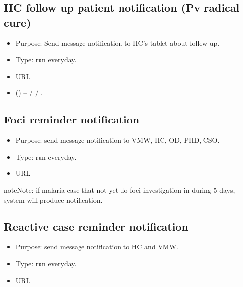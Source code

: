 \documentclass[letterpaper,10pt,english,openany,oneside]{sphinxmanual}
\begin{document}
\subsection{HC follow up patient notification (Pv radical cure)}
\label{\detokenize{cron-job/cron-job:hc-follow-up-patient-notification-pv-radical-cure}}\begin{itemize}
\item {} 
\sphinxAtStartPar
Purpose: Send message notification to HC’s tablet about follow up.

\item {} 
\sphinxAtStartPar
Type: run everyday.

\item {} 
\sphinxAtStartPar
URL 

\item {} 
\sphinxAtStartPar
{} () –  /  / .

\end{itemize}


\subsection{Foci reminder notification}
\label{\detokenize{cron-job/cron-job:foci-reminder-notification}}\begin{itemize}
\item {} 
\sphinxAtStartPar
Purpose: send message notification to VMW, HC, OD, PHD, CSO.

\item {} 
\sphinxAtStartPar
Type: run everyday.

\item {} 
\sphinxAtStartPar
URL 

\end{itemize}

\begin{sphinxadmonition}{note}{Note:}
\sphinxAtStartPar
if malaria case that not yet do foci investigation in during 5 days, system will produce notification.
\end{sphinxadmonition}


\subsection{Reactive case reminder notification}
\label{\detokenize{cron-job/cron-job:reactive-case-reminder-notification}}\begin{itemize}
\item {} 
\sphinxAtStartPar
Purpose: send message notification to HC and VMW.

\item {} 
\sphinxAtStartPar
Type: run everyday.

\item {} 
\sphinxAtStartPar
URL 

\end{itemize}
\end{document}
